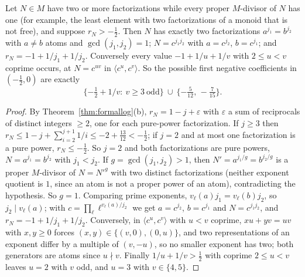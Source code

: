 \begin{corollary}\label{cor:firstneg}
Let $N\in M$ have two or more factorizations while every proper $M$-divisor of $N$ has one (for example, the least element with two factorizations of a monoid that is not free), and suppose $r_N>-\tfrac12$. Then $N$ has exactly two factorizations $a^{j_1}=b^{j_2}$ with $a\ne b$ atoms and $\gcd(j_1,j_2)=1$; $N=c^{j_1j_2}$ with $a=c^{j_2}$, $b=c^{j_1}$; and $r_N=-1+1/j_1+1/j_2$.
Conversely every value $-1+1/u+1/v$ with $2\le u<v$ coprime occurs, at $N=c^{uv}$ in $\langle c^u,c^v\rangle$. So the possible first negative coefficients in $(-\tfrac12,0)$ are exactly
\[
\{-\tfrac12+1/v:\ v\ge3\ \text{odd}\}\ \cup\ \{-\tfrac5{12},\,-\tfrac7{15}\}.
\]
\end{corollary}

\begin{proof}
By Theorem~\ref{thm:formallog}(b), $r_N=1-j+\varepsilon$ with $\varepsilon$ a sum of reciprocals of distinct integers $\ge2$, one for each pure-power factorization. If $j\ge3$ then $r_N\le1-j+\sum_{i=2}^{j+1}1/i\le-2+\tfrac{13}{12}<-\tfrac12$; if $j=2$ and at most one factorization is a pure power, $r_N\le-\tfrac12$. So $j=2$ and both factorizations are pure powers, $N=a^{j_1}=b^{j_2}$ with $j_1<j_2$.
If $g=\gcd(j_1,j_2)>1$, then $N'=a^{j_1/g}=b^{j_2/g}$ is a proper $M$-divisor of $N=N'^g$ with two distinct factorizations (neither exponent quotient is $1$, since an atom is not a proper power of an atom), contradicting the hypothesis. So $g=1$. Comparing prime exponents, $v_\ell(a)j_1=v_\ell(b)j_2$, so $j_2\mid v_\ell(a)$; with $c=\prod_\ell\ell^{v_\ell(a)/j_2}$ we get $a=c^{j_2}$, $b=c^{j_1}$ and $N=c^{j_1j_2}$, and $r_N=-1+1/j_1+1/j_2$.
Conversely, in $\langle c^u,c^v\rangle$ with $u<v$ coprime, $xu+yv=uv$ with $x,y\ge0$ forces $(x,y)\in\{(v,0),(0,u)\}$, and two representations of an exponent differ by a multiple of $(v,-u)$, so no smaller exponent has two; both generators are atoms since $u\nmid v$.
Finally $1/u+1/v>\tfrac12$ with coprime $2\le u<v$ leaves $u=2$ with $v$ odd, and $u=3$ with $v\in\{4,5\}$.
\end{proof}

